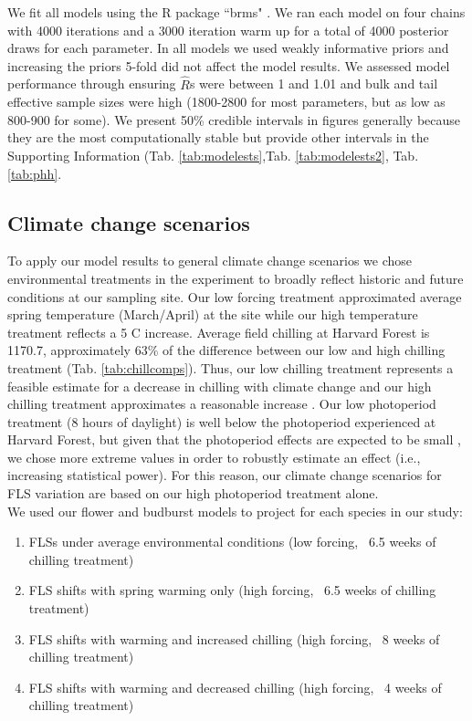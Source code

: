 \documentclass[11pt]{article}\usepackage[]{graphicx}\usepackage[]{color}
\begin{document}
\noindent We fit all models using the R package ``brms" \citep{Burkner2018}. We ran each model on four chains with 4000 iterations and a 3000 iteration warm up for a total of 4000 posterior draws for each parameter. In all models we used weakly informative priors and increasing the priors 5-fold did not affect the model results. We assessed  model performance through ensuring $\hat{R}$s were between 1 and 1.01 and bulk and tail effective sample sizes were high (1800-2800 for most parameters, but as low as  800-900 for some). We present 50\% credible intervals in figures generally because they are the most computationally stable \citep{Gelman2013} but provide other intervals in the Supporting Information (Tab. \ref{tab:modelests},Tab. \ref{tab:modelests2}, Tab. \ref{tab:phh}. \\

\subsection*{Climate change scenarios}
\noindent To apply our model results to general climate change scenarios we chose environmental treatments in the experiment to broadly reflect historic and future conditions at our sampling site. Our low forcing treatment approximated average spring temperature (March/April) at the site while our high temperature treatment reflects a 5 \degree C increase. Average field chilling \citep[calculated from 15 October - 15 April, measured in Chill Hours,][]{Weinberger:1950aa} at Harvard Forest is 1170.7, approximately  63\% of the difference between our low and high chilling treatment (Tab. \ref{tab:chillcomps}). Thus, our low chilling treatment represents a feasible estimate for a decrease in chilling with climate change and our high chilling treatment approximates a reasonable increase \citep{Luedeling:2012aa}. Our low photoperiod treatment (8 hours of daylight) is well below the photoperiod experienced at Harvard Forest, but given that the photoperiod effects are expected to be small \citep{Laube:2014a}, we chose more extreme values in order to robustly estimate an effect (i.e., increasing statistical power). For this reason, our climate change scenarios for FLS variation are based on our high photoperiod treatment alone.\\


\noindent We used our flower and budburst models to project for each species in our study:
\begin{enumerate}
\item FLSs under average environmental conditions  (low forcing, ~6.5 weeks of chilling treatment)
\item FLS shifts with spring warming only (high forcing, ~6.5 weeks of chilling treatment)
\item FLS shifts with warming and increased chilling (high forcing, ~8 weeks of chilling treatment)
\item FLS shifts with warming and decreased chilling (high forcing, ~4 weeks of chilling treatment)
\end{enumerate}
\end{document}
